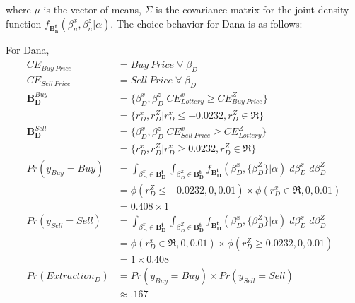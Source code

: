 \documentclass[11pt,a4paper]{report}
\newcommand\CE{\ensuremath{\mathit{CE}}}    %
\newcommand\Prob{\ensuremath{\mathit{Pr}}}  %
\begin{document}
\addtocounter{footnote}{-1}

\noindent where $\mu$ is the vector of means, $\Sigma$ is the covariance matrix for the joint density function $f_{\mathbf{B_n^t}}(\beta_n^x,\beta_n^z|\alpha)$.
The choice behavior for Dana is as follows:

\noindent For Dana,
\begin{align}
	\begin{split}
		{\CE}_{\mathit{Buy\ Price}} &= \mathit{Buy\ Price} \;\forall\; \beta_D\\
		{\CE}_{\mathit{Sell\ Price}} &= \mathit{Sell\ Price} \;\forall\; \beta_D\\[1.5ex]
		\mathbf{B_D^{\mathit{Buy}}} &= \{ \beta_D^x,\beta_D^z | {\CE}_{\mathit{Lottery}}^x \geq {\CE}_{\mathit{Buy\ Price}}^Z \}\\
		&= \{ r_D^x,r_D^Z | r_D^x \leq -0.0232, r_D^Z \in \Re\}\\[1.5ex]
		\mathbf{B_D^{\mathit{Sell}}} &= \{ \beta_D^x,\beta_D^z | {\CE}_{\mathit{Sell\ Price}}^x \geq {\CE}_{\mathit{Lottery}}^Z \}\\
		&= \{ r_D^x,r_D^Z | r_D^x \geq 0.0232, r_D^Z \in \Re\}\\[1.5ex]
		{\Prob}(y_{\mathit{Buy}} = \mathit{Buy}) &= \int_{\beta_D^x \in \mathbf{B^t_D}}\int_{\beta_D^Z \in \mathbf{B^t_D}} f_{\mathbf{B^t_D}}\!\left(\beta_D^x,\{\beta_D^Z\}|\alpha\right) \;d\beta_D^x \; d\beta_D^Z\\
		&= \phi(r_D^Z \leq -0.0232,0,0.01) \times \phi(r_D^x \in \Re,0,0.01)\\
		&= 0.408 \times 1\\
		{\Prob}(y_{\mathit{Sell}} = \mathit{Sell}) &= \int_{\beta_D^x \in \mathbf{B^t_D}}\int_{\beta_D^Z \in \mathbf{B^t_D}} f_{\mathbf{B^t_D}}\!\left(\beta_D^x,\{\beta_D^Z\}|\alpha\right) \;d\beta_D^x \; d\beta_D^Z\\
		&= \phi(r_D^x \in \Re,0,0.01) \times \phi(r_D^Z \geq 0.0232,0,0.01)\\
		&= 1 \times 0.408\\
	{\Prob}(\mathit{Extraction}_D) &= {\Prob}(y_{\mathit{Buy}} = \mathit{Buy}) \times {\Prob}(y_{\mathit{Sell}} = \mathit{Sell})\\
	&\approx .167
	\end{split}
\end{align}
\end{document}
